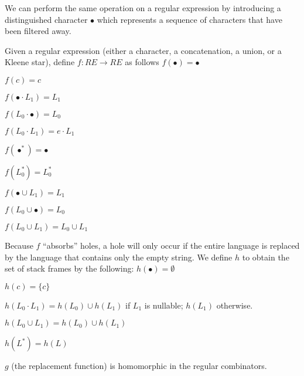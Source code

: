 \documentclass{sigplanconf}
\begin{document}
We can perform the same operation on a regular expression by introducing a distinguished character $\bullet$ which represents a sequence of characters that have been filtered away.

Given a regular expression (either a character, a concatenation, a union, or a Kleene star), define $f:RE \longrightarrow RE$ as follows
$f(\bullet)=\bullet$

$f(c)=c$

$f(\bullet\cdot L_1)=L_1$

$f(L_0\cdot\bullet)=L_0$

$f(L_0\cdot L_1)=e\cdot L_1$

$f(\bullet^*)=\bullet$

$f(L_0^*)=L_0^*$

$f(\bullet\cup L_1)=L_1$

$f(L_0\cup\bullet)=L_0$

$f(L_0\cup L_1)=L_0\cup L_1$

Because $f$ ``absorbs'' holes, a hole will only occur if the entire language is replaced by the language that contains only the empty string.
We define $h$ to obtain the set of stack frames by the following:
$h(\bullet)=\emptyset$

$h(c)=\{c\}$

$h(L_0\cdot L_1)=h(L_0)\cup h(L_1)$ if $L_1$ is nullable; $h(L_1)$ otherwise.

$h(L_0\cup L_1)=h(L_0)\cup h(L_1)$

$h(L^*)=h(L)$

$g$ (the replacement function) is homomorphic in the regular combinators. 




\end{document}
